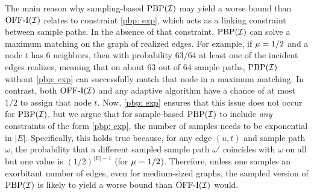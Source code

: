 {%
The main reason why sampling-based $\mathrm{PBP}(\mathcal I)$ may yield a worse bound than $ \mathrm{\mathrm{OFF}}\textrm{-}\mathrm{I}(\mathcal I) $ relates to constraint \eqref{pbp: exp}, which acts as a linking constraint between sample paths. 
In the absence of that constraint, $\mathrm{PBP}(\mathcal I)$ can solve a maximum matching on the graph of realized edges. For example, if $\mu=1/2$ and a node $t$ has 6 neighbors, then with probability $63/64$ at least one of the incident edges realizes, meaning that on about 63 out of 64 sample paths, $\mathrm{PBP}(\mathcal I)$ without \eqref{pbp: exp} can successfully match that node in a maximum matching. In contrast, both $\mathrm{\mathrm{OFF}}\textrm{-}\mathrm{I}(\mathcal I)$ and any adaptive algorithm have a chance of at most $1/2$ to assign that node $t$. Now, \eqref{pbp: exp} ensures that this issue does not occur for $\mathrm{PBP}(\mathcal I)$, but we argue that for sample-based $\mathrm{PBP}(\mathcal I)$ to include \emph{any} constraints of the form \eqref{pbp: exp}, the number of samples needs to be exponential in $|E|$. Specifically, this holds true because, for any edge $(u,t)$ and sample path $\omega$, the probability that a different sampled sample path $\omega'$ coincides with $\omega$ on all but one value is $(1/2)^{|E|-1}$ (for $\mu=1/2$). Therefore, unless one samples an exorbitant number of edges, even for medium-sized graphs, the sampled version of $\mathrm{PBP}(\mathcal I)$ is likely to yield a worse bound than $\mathrm{\mathrm{OFF}}\textrm{-}\mathrm{I}(\mathcal I)$ would.


}
